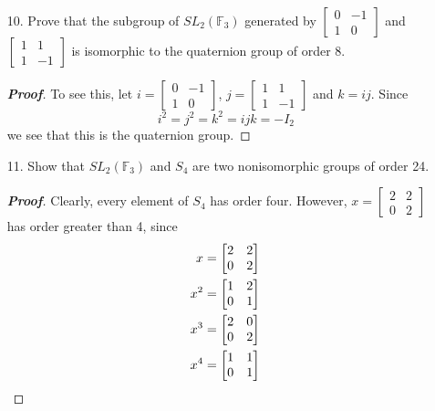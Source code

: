 \documentclass[12pt,leqno]{book}
\theoremstyle{definition}
\newcommand{\F}{\mathbb{F}}
\newenvironment{Proof}{\begin{proof}[\textnormal{\textbf{Proof}}]}{\end{proof}}
\begin{document}
\begin{enumerate}
 \item [10.] Prove that the subgroup of $SL_2(\F_3)$ generated by $\begin{bmatrix}0&-1\\1&0\end{bmatrix}$ and $\begin{bmatrix}1&1\\1&-1\end{bmatrix}$ is isomorphic to the quaternion group of order 8.
\begin{Proof}
 To see this, let $i=\begin{bmatrix}0&-1\\1&0\end{bmatrix}$, $j=\begin{bmatrix}1&1\\1&-1\end{bmatrix}$ and $k=ij$. Since \[i^2=j^2=k^2=ijk=-I_2\] we see that this is the quaternion group. 
\end{Proof}
 \item [11.] Show that $SL_2(\F_3)$ and $S_4$ are two nonisomorphic groups of order 24.
\begin{Proof}
 Clearly, every element of $S_4$ has order four. However, $x=\begin{bmatrix}2&2\\0&2\end{bmatrix}$ has order greater than 4, since \begin{align*}x&=\begin{bmatrix}2&2\\0&2\end{bmatrix}\\x^2&=\begin{bmatrix}1&2\\0&1\end{bmatrix}\\x^3&=\begin{bmatrix}2&0\\0&2\end{bmatrix}\\x^4&=\begin{bmatrix}1&1\\0&1\end{bmatrix}\qedhere\end{align*}
\end{Proof}

\end{enumerate}
\end{document}

